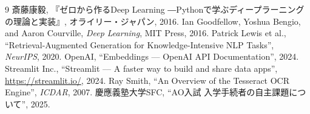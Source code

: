 \documentclass[uplatex, dvipdfmx, a4paper, 11pt]{jsarticle}
\begin{document}
\begin{thebibliography}{9}
   斎藤康毅, 『ゼロから作るDeep Learning ―Pythonで学ぶディープラーニングの理論と実装』, オライリー・ジャパン, 2016.
   Ian Goodfellow, Yoshua Bengio, and Aaron Courville, \textit{Deep Learning}, MIT Press, 2016.
   Patrick Lewis et al., ``Retrieval-Augmented Generation for Knowledge-Intensive NLP Tasks'', \textit{NeurIPS}, 2020.
   OpenAI, ``Embeddings --- OpenAI API Documentation'', 2024.
   Streamlit Inc., ``Streamlit --- A faster way to build and share data apps'', \url{https://streamlit.io/}, 2024.
   Ray Smith, ``An Overview of the Tesseract OCR Engine'', \textit{ICDAR}, 2007.
   慶應義塾大学SFC, ``AO入試 入学手続者の自主課題について'', 2025.
\end{thebibliography}
\end{document}
